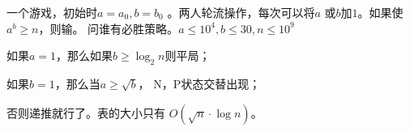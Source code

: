 \begin{prob}
	一个游戏，初始时$a=a_0,b=b_0$
	。两人轮流操作，每次可以将$a$
	或$b$加$1$。如果使$a^b \ge n$，则输。
	问谁有必胜策略。$a \le 10^4, b \le 30,n \le 10^9$
\end{prob}

\begin{sol}
	如果$a=1$，那么如果$b \ge \log_2n$则平局；
	\par
	如果$b=1$，那么当$a \ge \sqrt{b}$，
	N，P状态交替出现；\par
	否则递推就行了。表的大小只有
	$O(\sqrt{n} \cdot \log n)$。
\end{sol}
